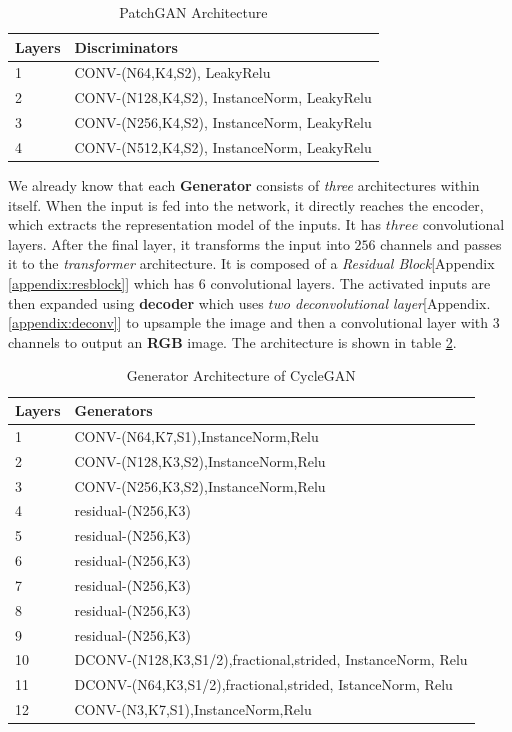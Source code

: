 \begin{table}[htbp]
\caption{PatchGAN Architecture}
\label{Patch_Disc}
\begin{tabular}{ll}
\hline
Layers &Discriminators \\
\hline
\hline
1 & CONV-(N64,K4,S2),  LeakyRelu \\
2 & CONV-(N128,K4,S2), InstanceNorm, LeakyRelu\\
3 & CONV-(N256,K4,S2), InstanceNorm, LeakyRelu\\
4 & CONV-(N512,K4,S2), InstanceNorm, LeakyRelu\\
\hline
\hline

\end{tabular}
\end{table}


We already know that each \textbf{Generator} consists of \textit{three} architectures within itself. When the input is fed into the network, it directly reaches the encoder, which extracts the representation model of the inputs. It has $three$ convolutional layers. After the final layer, it transforms the input into $256$ channels and passes it to the \textit{transformer} architecture. It is composed of a \textit{Residual Block}[Appendix \ref{appendix:resblock}] which has $6$ convolutional layers. The activated inputs are then expanded using \textbf{decoder} which uses $two$ \textit{deconvolutional layer}[Appendix. \ref{appendix:deconv}] to upsample the image and then a convolutional layer with 3 channels to output an \textbf{RGB} image. The architecture is shown in table \ref{gen_cyc}.
\begin{table}[htbp]
\caption{Generator Architecture of CycleGAN}
\label{gen_cyc}
\begin{tabular}{ll}
\hline
Layers &Generators\\
\hline
\hline
1 & CONV-(N64,K7,S1),InstanceNorm,Relu\\
2 & CONV-(N128,K3,S2),InstanceNorm,Relu\\
3 & CONV-(N256,K3,S2),InstanceNorm,Relu\\
4 & residual-(N256,K3)\\
5 & residual-(N256,K3)\\
6 & residual-(N256,K3)\\
7 & residual-(N256,K3)\\
8 & residual-(N256,K3)\\
9 & residual-(N256,K3)\\
10 & DCONV-(N128,K3,S1/2),fractional,strided, InstanceNorm, Relu\\
11 & DCONV-(N64,K3,S1/2),fractional,strided, IstanceNorm, Relu\\
12 & CONV-(N3,K7,S1),InstanceNorm,Relu\\
\hline
\hline
\end{tabular}
\end{table}


